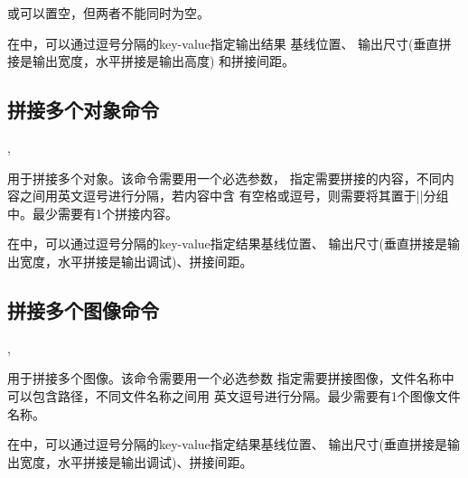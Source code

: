 \documentclass[full]{l3doc}
\begin{document}
\begin{documentation}
  或可以置空，但两者不能同时为空。

  在中，可以通过逗号分隔的key-value指定输出结果
  基线位置、 输出尺寸(垂直拼接是输出宽度，水平拼接是输出高度)
  和拼接间距。

\subsection{拼接多个对象命令}

\begin{function}{\joinboxes,\joinboxes*}
  \begin{syntax}
      
      
  \end{syntax}

\end{function}

  用于拼接多个对象。该命令需要用一个必选参数，
  指定需要拼接的内容，不同内容之间用英文逗号进行分隔，若内容中含
  有空格或逗号，则需要将其置于|{}|分组中。最少需要有1个拼接内容。

  在中，可以通过逗号分隔的key-value指定结果基线位置、
  输出尺寸(垂直拼接是输出宽度，水平拼接是输出调试)、拼接间距。

\subsection{拼接多个图像命令}

\begin{function}{\joinfigs,\joinfigs*}
  \begin{syntax}
      
      
  \end{syntax}

\end{function}

  用于拼接多个图像。该命令需要用一个必选参数
  指定需要拼接图像，文件名称中可以包含路径，不同文件名称之间用
  英文逗号进行分隔。最少需要有1个图像文件名称。

  在中，可以通过逗号分隔的key-value指定结果基线位置、
  输出尺寸(垂直拼接是输出宽度，水平拼接是输出调试)、拼接间距。

\subsection{}
\begin{function}{\joinset}
  \begin{syntax}
     
  \end{syntax}


\end{function}
\end{documentation}
\end{document}
